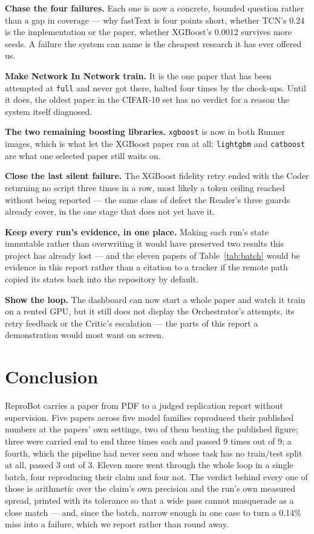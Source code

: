\documentclass[10pt,twocolumn]{article}
\begin{document}
\textbf{Chase the four failures.} Each one is now a concrete, bounded question rather than a
gap in coverage --- why fastText is four points short, whether TCN's 0.24 is the implementation
or the paper, whether XGBoost's 0.0012 survives more seeds. A failure the system can name is the
cheapest research it has ever offered us.

\textbf{Make Network In Network train.} It is the one paper that has been attempted at
\texttt{full} and never got there, halted four times by the check-ups. Until it does, the oldest
paper in the CIFAR-10 set has no verdict for a reason the system itself diagnosed.

\textbf{The two remaining boosting libraries.} \texttt{xgboost} is now in both Runner images,
which is what let the XGBoost paper run at all; \texttt{lightgbm} and \texttt{catboost} are what
one selected paper still waits on.

\textbf{Close the last silent failure.} The XGBoost fidelity retry ended with the Coder returning
no script three times in a row, most likely a token ceiling reached without being reported --- the
same class of defect the Reader's three guards already cover, in the one stage that does not yet
have it.

\textbf{Keep every run's evidence, in one place.} Making each run's state immutable rather than
overwriting it would have preserved two results this project has already lost --- and the eleven
papers of Table~\ref{tab:batch} would be evidence in this report rather than a citation to a
tracker if the remote path copied its states back into the repository by default.

\textbf{Show the loop.} The dashboard can now start a whole paper and watch it train on a rented
GPU, but it still does not display the Orchestrator's attempts, its retry feedback or the
Critic's escalation --- the parts of this report a demonstration would most want on screen.

\section{Conclusion}
\label{sec:conclusion}

ReproBot carries a paper from PDF to a judged replication report without supervision. Five papers
across five model families reproduced their published numbers at the papers' own settings, two of
them beating the published figure; three were carried end to end three times each and passed 9
times out of 9; a fourth, which the pipeline had never seen and whose task has no train/test split
at all, passed 3 out of 3. Eleven more went through the whole loop in a single batch, four
reproducing their claim and four not. The verdict behind every one of those is arithmetic over the
claim's own precision and the run's own measured spread, printed with its tolerance so that a wide
pass cannot masquerade as a close match --- and, since the batch, narrow enough in one case to
turn a 0.14\% miss into a failure, which we report rather than round away.
\end{document}
